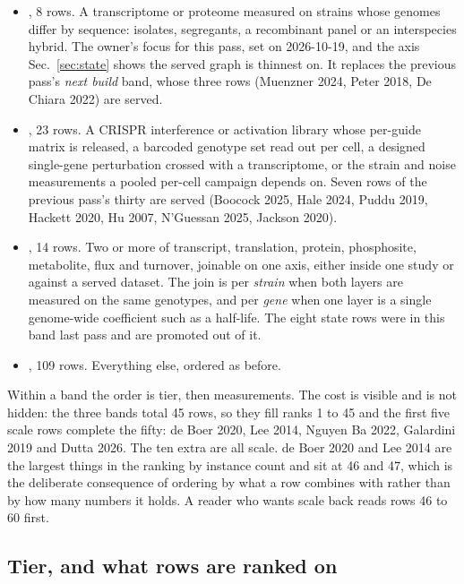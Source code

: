 \begin{itemize}[leftmargin=1.2em,itemsep=1pt,topsep=2pt]
  \item {}, 8 rows. A transcriptome or proteome measured on
    strains whose genomes differ by sequence: isolates, segregants, a recombinant panel or
    an interspecies hybrid. The owner's focus for this pass, set on 2026-10-19, and the
    axis Sec.~\ref{sec:state} shows the served graph is thinnest on. It replaces the
    previous pass's \emph{next build} band, whose three rows (Muenzner 2024, Peter 2018,
    De Chiara 2022) are served.
  \item {}, 23 rows. A CRISPR interference or activation library whose
    per-guide matrix is released, a barcoded genotype set read out per cell, a designed
    single-gene perturbation crossed with a transcriptome, or the strain and noise
    measurements a pooled per-cell campaign depends on. Seven rows of the previous pass's
    thirty are served (Boocock 2025, Hale 2024, Puddu 2019, Hackett 2020, Hu 2007,
    N'Guessan 2025, Jackson 2020).
  \item {}, 14 rows. Two or more of transcript, translation,
    protein, phosphosite, metabolite, flux and turnover, joinable on one axis, either
    inside one study or against a served dataset. The join is per \emph{strain} when
    both layers are measured on the same genotypes, and per \emph{gene} when one layer is
    a single genome-wide coefficient such as a half-life. The eight state rows were in
    this band last pass and are promoted out of it.
  \item {}, 109 rows. Everything else, ordered as before.
\end{itemize}

Within a band the order is tier, then measurements. The cost is visible and is not hidden:
the three bands total 45 rows, so they fill ranks 1 to 45 and the first five scale rows
complete the fifty: de Boer 2020, Lee 2014, Nguyen Ba 2022, Galardini 2019 and Dutta 2026.
The ten extra are all scale. de Boer 2020 and Lee 2014 are the largest things in the
ranking by instance count and sit at 46 and 47, which is the deliberate consequence of
ordering by what a row combines with rather than by how many numbers it holds. A reader
who wants scale back reads rows 46 to 60 first.

\subsection{Tier, and what rows are ranked on}

